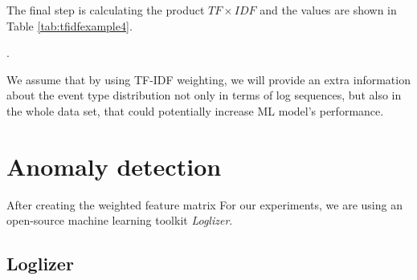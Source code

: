 The final step is calculating the product $TF \times IDF$ and the values are shown in Table \ref{tab:tfidfexample4}.

\begin{table}[!h]
    \centering
    \caption{TF and IDF scores from the example are multiplied to obtain TF-IDF}.
    \label{tab:tfidfexample4}
\end{table}

We assume that by using TF-IDF weighting, we will provide an extra information about the event type distribution not only in terms of log sequences, but also in the whole data set, that could potentially increase ML model's performance. 

\section{Anomaly detection}

After creating the weighted feature matrix 
For our experiments, we are using an open-source machine learning toolkit \textit{Loglizer}. 

\subsection{Loglizer}

